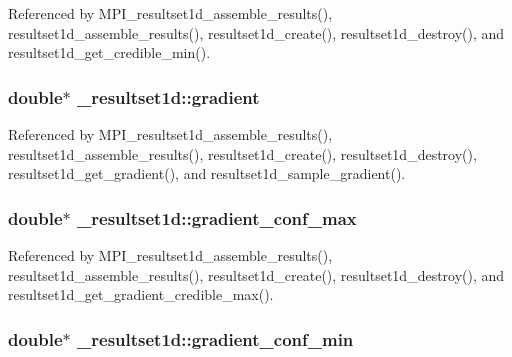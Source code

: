 Referenced by M\+P\+I\+\_\+resultset1d\+\_\+assemble\+\_\+results(), resultset1d\+\_\+assemble\+\_\+results(), resultset1d\+\_\+create(), resultset1d\+\_\+destroy(), and resultset1d\+\_\+get\+\_\+credible\+\_\+min().

\subsubsection[{\texorpdfstring{gradient}{gradient}}]{\setlength{\rightskip}{0pt plus 5cm}double$\ast$ \+\_\+resultset1d\+::gradient}\hypertarget{struct__resultset1d_aea8021e8282fb13b0156a60bb19fc56b}{}\label{struct__resultset1d_aea8021e8282fb13b0156a60bb19fc56b}


Referenced by M\+P\+I\+\_\+resultset1d\+\_\+assemble\+\_\+results(), resultset1d\+\_\+assemble\+\_\+results(), resultset1d\+\_\+create(), resultset1d\+\_\+destroy(), resultset1d\+\_\+get\+\_\+gradient(), and resultset1d\+\_\+sample\+\_\+gradient().

\subsubsection[{\texorpdfstring{gradient\+\_\+conf\+\_\+max}{gradient_conf_max}}]{\setlength{\rightskip}{0pt plus 5cm}double$\ast$ \+\_\+resultset1d\+::gradient\+\_\+conf\+\_\+max}\hypertarget{struct__resultset1d_a1c33684db06e07014509d2d96711f20e}{}\label{struct__resultset1d_a1c33684db06e07014509d2d96711f20e}


Referenced by M\+P\+I\+\_\+resultset1d\+\_\+assemble\+\_\+results(), resultset1d\+\_\+assemble\+\_\+results(), resultset1d\+\_\+create(), resultset1d\+\_\+destroy(), and resultset1d\+\_\+get\+\_\+gradient\+\_\+credible\+\_\+max().

\subsubsection[{\texorpdfstring{gradient\+\_\+conf\+\_\+min}{gradient_conf_min}}]{\setlength{\rightskip}{0pt plus 5cm}double$\ast$ \+\_\+resultset1d\+::gradient\+\_\+conf\+\_\+min}\hypertarget{struct__resultset1d_ab5aa2af42be5d69321323cc532a554f8}{}\label{struct__resultset1d_ab5aa2af42be5d69321323cc532a554f8}


